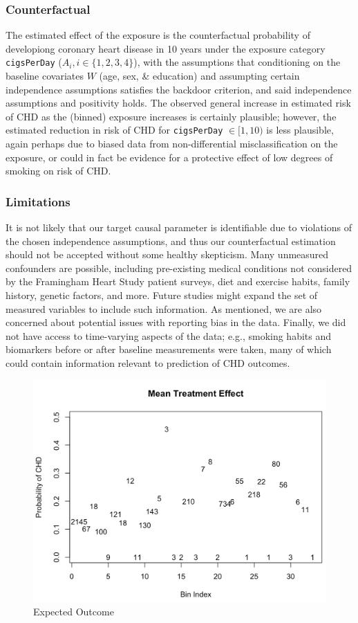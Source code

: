 \documentclass[]{article}
\begin{document}
\hypertarget{counterfactual}{%
\subsubsection{Counterfactual}\label{counterfactual}}

The estimated effect of the exposure is the counterfactual probability
of developiong coronary heart disease in 10 years under the exposure
category \texttt{cigsPerDay} (\(A_i, i \in \{1, 2, 3, 4 \}\)), with the
assumptions that conditioning on the baseline covariates \(W\) (age,
sex, \& education) and assumpting certain independence assumptions
satisfies the backdoor criterion, and said independence assumptions and
positivity holds. The observed general increase in estimated risk of CHD
as the (binned) exposure increases is certainly plausible; however, the
estimated reduction in risk of CHD for \texttt{cigsPerDay}
\(\in [1, 10)\) is less plausible, again perhaps due to biased data from
non-differential misclassification on the exposure, or could in fact be
evidence for a protective effect of low degrees of smoking on risk of
CHD.

\hypertarget{limitations}{%
\subsubsection{Limitations}\label{limitations}}

It is not likely that our target causal parameter is identifiable due to
violations of the chosen independence assumptions, and thus our
counterfactual estimation should not be accepted without some healthy
skepticism. Many unmeasured confounders are possible, including
pre-existing medical conditions not considered by the Framingham Heart
Study patient surveys, diet and exercise habits, family history, genetic
factors, and more. Future studies might expand the set of measured
variables to include such information. As mentioned, we are also
concerned about potential issues with reporting bias in the data.
Finally, we did not have access to time-varying aspects of the data;
e.g., smoking habits and biomarkers before or after baseline
measurements were taken, many of which could contain information
relevant to prediction of CHD outcomes.

\begin{figure}[h]

{\centering \includegraphics[width=0.5\linewidth]{./effect} 

}

\caption{Expected Outcome}\label{fig:fig2}
\end{figure}
\end{document}
